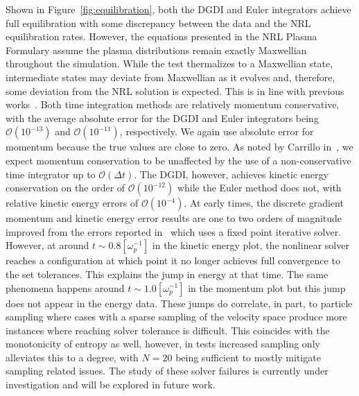 \documentclass[preprint,12pt]{elsarticle}
\theoremstyle{definition}
\begin{document}
Shown in Figure~\ref{fig:equilibration}, both the DGDI and Euler integrators achieve full equilibration with some discrepancy between the data and the NRL equilibration rates. However, the equations presented in the NRL Plasma Formulary assume the plasma distributions remain exactly Maxwellian throughout the simulation. While the test thermalizes to a Maxwellian state, intermediate states may deviate from Maxwellian as it evolves and, therefore, some deviation from the NRL solution is expected. This is in line with previous works~\cite{Zonta2022,Adams2025_2}. Both time integration methods are relatively momentum conservative, with the average absolute error for the DGDI and Euler integrators being $\mathcal{O}(10^{-13})$ and $\mathcal{O}(10^{-11})$, respectively. We again use absolute error for momentum because the true values are close to zero. As noted by Carrillo in~\cite{Carrillo2020}, we expect momentum conservation to be unaffected by the use of a non-conservative time integrator up to $\mathcal{O} (\Delta t)$. The DGDI, however, achieves kinetic energy conservation on the order of $\mathcal{O}(10^{-12})$ while the Euler method does not, with relative kinetic energy errors of $\mathcal{O}(10^{-4})$. At early times, the discrete gradient momentum and kinetic energy error results are one to two orders of magnitude improved from the errors reported in~\cite{Hu2024} which uses a fixed point iterative solver. However, at around $t\sim0.8\left[\omega_p^{-1}\right]$ in the kinetic energy plot, the nonlinear solver reaches a configuration at which point it no longer achieves full convergence to the set tolerances. This explains the jump in energy at that time. The same phenomena happens around $t\sim1.0\left[\omega_p^{-1}\right]$ in the momentum plot but this jump does not appear in the energy data. 
These jumps do correlate, in part, to particle sampling where cases with a sparse sampling of the velocity space produce more instances where reaching solver tolerance is difficult. This coincides with the monotonicity of entropy as well, however, in tests increased sampling only alleviates this to a degree, with $N = 20$ being sufficient to mostly mitigate sampling related issues. The study of these solver failures is currently under investigation and will be explored in future work.
\end{document}
